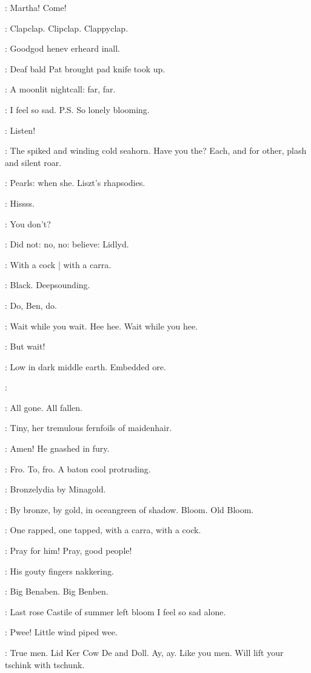 \BloomInt:
Martha!
Come!

:
Clapclap.
Clipclap.
Clappyclap.

\BloomInt:
Goodgod henev erheard inall.

:
Deaf bald Pat brought pad knife
took up.

\BloomInt:
A moonlit nightcall:
far, far.

\BloomInt:
I feel so sad.
P.S. So lonely blooming.

:
Listen!

\BloomInt:
The spiked and winding cold seahorn.
Have you the?
Each, and for other,
plash and silent roar.

\BloomInt:
Pearls: when she.
Liszt's rhapsodies.

:
Hissss.

\BloomInt:
You don't?

\BloomInt:
Did not:
no, no:
believe:
Lidlyd.

:
With a cock |
with a carra.

\BloomInt:
Black.
Deepsounding.

\simon:
Do, Ben, do.

\BloomInt:
Wait while you wait.
Hee hee.
Wait while you hee.

\BloomInt:
But wait!

\BloomInt:
Low in dark middle earth.
Embedded ore.

\BloomInt:

\BloomInt:
All gone.
All fallen.

\BloomInt:
Tiny, her tremulous fernfoils of maidenhair.

:
Amen!
He gnashed in fury.

:
Fro.
To, fro.
A baton cool protruding.

\BloomInt:
Bronzelydia by Minagold.

:
By bronze,
by gold,
in oceangreen of shadow.
Bloom.
Old Bloom.

:
One rapped,
one tapped,
with a carra,
with a cock.

\BloomInt:
Pray for him!
Pray, good people!

:
His gouty fingers nakkering.

\simon:
Big Benaben.
Big Benben.

\BloomInt:
Last rose Castile of summer left bloom I feel so sad alone.

\BloomInt:
Pwee!
Little wind piped wee.

\BloomInt:
True men.
Lid Ker Cow De and Doll.
Ay, ay.
Like you men.
Will lift your tschink with tschunk.

